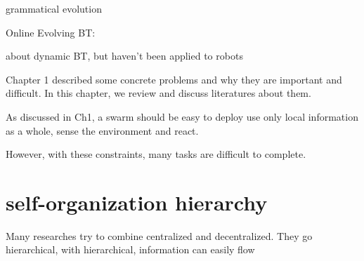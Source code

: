 grammatical evolution
\cite{neupane2019learning}
\cite{kuckling2022automode}

Online Evolving BT:

\cite{jones2019onboard}
\cite{venkata2023kt}


\cite{florez2008dynamic} about dynamic BT, but haven't been applied to robots















Chapter 1 described some concrete problems and why they are important and difficult.
In this chapter, we review and discuss literatures about them.

As discussed in Ch1, a swarm should be
    easy to deploy
    use only local information
    as a whole, sense the environment and react.

However, with these constraints, many tasks are difficult to complete.

\section{self-organization hierarchy}

Many researches try to combine centralized and decentralized.
They go hierarchical, with hierarchical, information can easily flow

